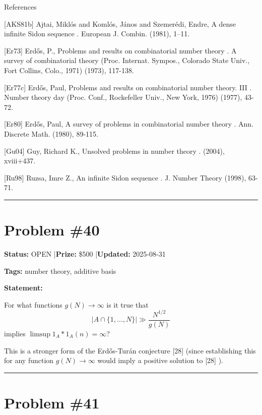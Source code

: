 \documentclass{article}
\begin{document}
References

[AKS81b] Ajtai, Mikl\'os and Koml\'os, J\'{a}nos and Szemer\'{e}di, Endre, A dense infinite Sidon sequence . European J. Combin. (1981), 1--11.

[Er73] Erd\H{o}s, P., Problems and results on combinatorial number theory . A survey of combinatorial theory (Proc. Internat. Sympos., Colorado State Univ., Fort Collins, Colo., 1971) (1973), 117-138.

[Er77c] Erd\H{o}s, Paul, Problems and results on combinatorial number theory. III . Number theory day (Proc. Conf., Rockefeller Univ., New York, 1976) (1977), 43-72.

[Er80] Erd\H{o}s, Paul, A survey of problems in combinatorial number theory . Ann. Discrete Math. (1980), 89-115.

[Gu04] Guy, Richard K., Unsolved problems in number theory . (2004), xviii+437.

[Ru98] Ruzsa, Imre Z., An infinite Sidon sequence . J. Number Theory (1998), 63-71.

\noindent\rule{\linewidth}{0.4pt}


\section{Problem \#40}
\label{prob:40}

\noindent\textbf{Status:} OPEN \quad|\quad \textbf{Prize:} \$500 \quad|\quad \textbf{Updated:} 2025-08-31

\noindent\textbf{Tags:} number theory, additive basis

\medskip

\noindent\textbf{Statement:}

For what functions $g(N)\to \infty$ is it true that\[\lvert A\cap \{1,\ldots,N\}\rvert \gg \frac{N^{1/2}}{g(N)}\]implies $\limsup 1_A\ast 1_A(n)=\infty$?




This is a stronger form of the Erd\H{o}s-Tur\'{a}n conjecture [28] (since establishing this for any function $g(N)\to \infty$ would imply a positive solution to [28] ).

\noindent\rule{\linewidth}{0.4pt}


\section{Problem \#41}
\label{prob:41}
\end{document}

